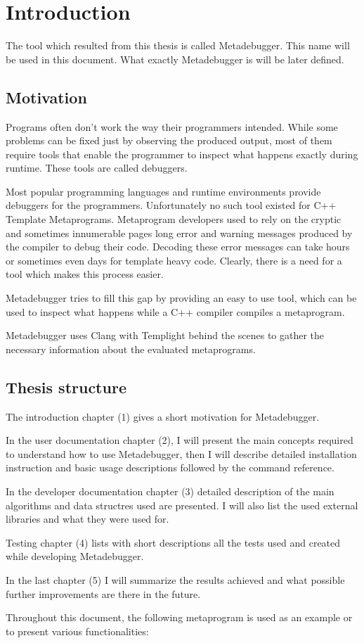 
\chapter{Introduction}

The tool which resulted from this thesis is called Metadebugger. This name will
be used in this document. What exactly Metadebugger is will be later defined.

\section{Motivation}

Programs often don't work the way their programmers intended. While some
problems can be fixed just by observing the produced output, most of them
require tools that enable the programmer to inspect what happens exactly
during runtime. These tools are called debuggers.

Most popular programming languages and runtime environments provide debuggers
for the programmers. Unfortunately no such tool existed for C++ Template
Metaprograms. Metaprogram developers used to rely on the cryptic and sometimes
innumerable pages long error and warning messages produced by the compiler to
debug their code. Decoding these error messages can take hours or sometimes
even days for template heavy code.\cite{sinkovics-phd}\cite{boost-spirit}
Clearly, there is a need for a tool which makes this process easier.

Metadebugger tries to fill this gap by providing an easy to use tool, which can
be used to inspect what happens while a C++ compiler compiles a metaprogram.

Metadebugger uses Clang with Templight behind the scenes to gather the
necessary information about the evaluated metaprograms.

\section{Thesis structure}

The introduction chapter (1) gives a short motivation for Metadebugger.

In the user documentation chapter (2), I will present the main concepts
required to understand how to use Metadebugger, then I will describe detailed
installation instruction and basic usage descriptions followed by the command
reference.

In the developer documentation chapter (3) detailed description of the main
algorithms and data structres used are presented. I will also list the used
external libraries and what they were used for.

Testing chapter (4) lists with short descriptions all the tests used and
created while developing Metadebugger.

In the last chapter (5) I will summarize the results achieved and what possible
further improvements are there in the future.


Throughout this document, the following metaprogram is used as an example or to
present various functionalities:

